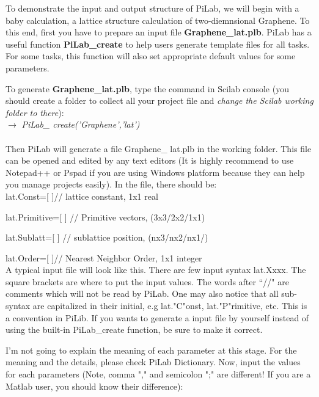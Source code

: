 \documentclass[10pt,a4paper]{article}
\begin{document}
To demonstrate the input and output structure of PiLab, we will begin with a baby calculation, a lattice structure calculation of two-diemnsional Graphene. To this end, first you have to prepare an input file \textbf{Graphene\_lat.plb}. PiLab has a useful function \textbf{PiLab\_create} to help users generate template files for all tasks. For some tasks, this function will also set appropriate default values for some parameters. 

To generate \textbf{Graphene\_lat.plb}, type the command in Scilab console (you should create a folder to collect all your project file and \emph{change the Scilab working folder to there}):\\

$\rightarrow$ \textit{PiLab\_ create('Graphene','lat')}\\ \\
Then PiLab will generate a file Graphene\_ lat.plb in the working folder. This file can be opened and edited by any text editors (It is highly recommend to use Notepad++ or Pspad if you are using Windows platform because they can help you manage projects easily). In the file, there should be: \\

lat.Const=[ ]\quad \quad \quad \quad \quad	// lattice constant, 1x1 real 

lat.Primitive=[ ] \quad \quad \quad // Primitive vectors, (3x3/2x2/1x1)

lat.Sublatt=[ ] \quad \quad \quad \quad // sublattice position, (nx3/nx2/nx1/)

lat.Order=[ ]\quad \quad \quad \quad \quad // Nearest Neighbor Order, 1x1 integer \\

A typical input file will look like this. There are few input syntax lat.Xxxx. The square brackets are where to put the input values. The words after ``//" are comments which will not be read by PiLab. One may also notice that all sub-syntax are capitalized in their initial, e.g lat."C"onst, lat."P"rimitive, etc. This is a convention in PiLib. If you wants to generate a input file by yourself instead of using the built-in PiLab\_create function, be sure to make it correct. 

I'm not going to explain the meaning of each parameter at this stage. For the meaning and the details, please check PiLab Dictionary. Now, input the values for each parameters (Note, comma "," and semicolon ";" are different! If you are a Matlab user, you should know their difference): \\
\end{document}
